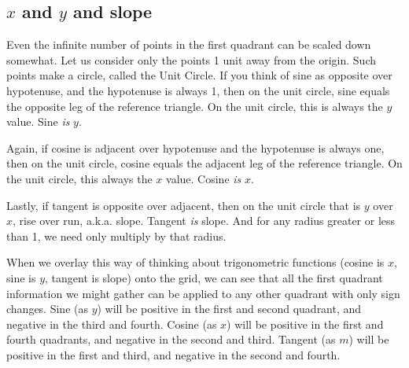 \subsection{$x$ and $y$ and slope}
Even the infinite number of points in the first quadrant can be scaled
down somewhat.  Let us consider only the points 1 unit away from
the origin.  Such points make a circle, called the Unit Circle.
If you think of sine as opposite over hypotenuse, and the hypotenuse is 
always 1, then on the unit circle, sine equals the opposite leg
of the reference triangle.  On the unit circle, this is always the $y$
value.  Sine \emph{is} $y$.

Again, if cosine is adjacent over hypotenuse and the hypotenuse is 
always one, then on the unit circle, cosine equals the adjacent leg
of the reference triangle.  On the unit circle, this always the $x$
value.  Cosine \emph{is} $x$.

Lastly, if tangent is opposite over adjacent, then on the unit circle
that is $y$ over $x$, rise over run, a.k.a. slope.  Tangent \emph{is}
slope.  And for any radius greater or less than 1, we need only 
multiply by that radius.  

When we overlay this way of thinking about trigonometric functions
(cosine is $x$, sine is $y$, tangent is slope) onto the grid, we can see
that all the first quadrant information we might gather can be
applied to any other quadrant with only sign changes.  Sine (as $y$)
will be positive in the first and second quadrant, and negative in
the third and fourth.  Cosine (as $x$) will be positive in the first
and fourth quadrants, and negative in the second and third.
Tangent (as $m$) will be positive in the first and third, and negative
in the second and fourth.

